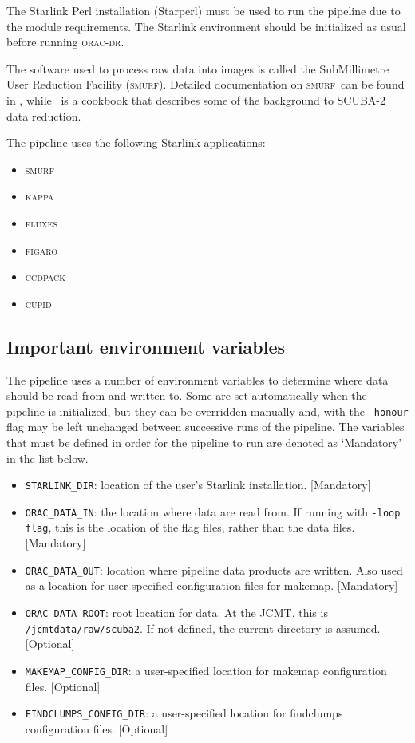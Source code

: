 \documentclass[twoside,11pt,nolof]{starlink}
\providecommand{\CCDPACK}{\textsc{ccdpack}}
\providecommand{\CUPID}{\textsc{cupid}}
\providecommand{\FIGARO}{\textsc{figaro}}
\providecommand{\FLUXES}{\textsc{fluxes}}
\providecommand{\KAPPA}{\textsc{kappa}}
\providecommand{\SMURF}{\textsc{smurf}}
\providecommand{\SMURFcook}{\xref{SC/21}{sc21}{}}
\providecommand{\SMURFsun}{\xref{SUN/258}{sun258}{}}
\providecommand{\oracdr}{\textsc{orac-dr}}
\providecommand{\task}[1]{\textsf{#1}}
\begin{document}
The Starlink Perl installation (Starperl) must be used to run the
pipeline due to the module requirements. The Starlink environment should be
initialized as usual before running \oracdr.

The software used to process raw data into images is called the
SubMillimetre User Reduction Facility (\SMURF). Detailed documentation
on \SMURF\ can be found in \SMURFsun, while \SMURFcook\ is a cookbook
that describes some of the background to SCUBA-2 data reduction.

The pipeline uses the following Starlink applications:
\begin{itemize}
\item \SMURF
\item \KAPPA
\item \FLUXES
\item \FIGARO
\item \CCDPACK
\item \CUPID
\end{itemize}

\subsection{Important environment variables}

The pipeline uses a number of environment variables to determine where
data should be read from and written to. Some are set automatically
when the pipeline is initialized, but they can be overridden manually
and, with the \verb+-honour+ flag may be left unchanged between
successive runs of the pipeline. The variables that must be defined in
order for the pipeline to run are denoted as `Mandatory' in the list
below.

\begin{itemize}

\item \verb+STARLINK_DIR+: location of the user's Starlink
  installation. [Mandatory]

\item \verb+ORAC_DATA_IN+: the location where data are read from. If
  running with \verb+-loop flag+, this is the location of the flag
  files, rather than the data files. [Mandatory]

\item \verb+ORAC_DATA_OUT+: location where pipeline data products are
  written. Also used as a location for user-specified configuration
  files for \task{makemap}. [Mandatory]

\item \verb+ORAC_DATA_ROOT+: root location for data. At the JCMT,
  this is \verb+/jcmtdata/raw/scuba2+. If not defined, the current
  directory is assumed. [Optional]

\item \verb+MAKEMAP_CONFIG_DIR+: a user-specified location for
  \task{makemap} configuration files. [Optional]

\item \verb+FINDCLUMPS_CONFIG_DIR+: a user-specified location for
  \task{findclumps} configuration files. [Optional]

\end{itemize}
\end{document}
